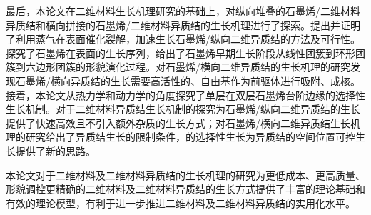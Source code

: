 \begin{chineseabstract}
    最后，本论文在二维材料生长机理研究的基础上，对纵向堆叠的石墨烯/二维材料异质结和横向拼接的石墨烯/二维材料异质结的生长机理进行了探索。提出并证明了利用蒸气在表面催化裂解，加速生长石墨烯/纵向二维异质结的方法及可行性。探究了石墨烯在表面的生长序列，给出了石墨烯早期生长阶段从线性团簇到环形团簇到六边形团簇的形貌演化过程。对石墨烯/横向二维异质结的生长机理的研究发现石墨烯/横向异质结的生长需要高活性的、自由基作为前驱体进行吸附、成核。接着，本论文从热力学和动力学的角度探究了单层在双层石墨烯台阶边缘的选择性生长机制。对于二维材料异质结生长机制的探究为石墨烯/纵向二维异质结的生长提供了快速高效且不引入额外杂质的生长方式；对石墨烯/横向二维异质结生长机理的研究给出了异质结生长的限制条件，的选择性生长为异质结的空间位置可控生长提供了新的思路。

    本论文对于二维材料及二维材料异质结的生长机理的研究为更低成本、更高质量、形貌调控更精确的二维材料及二维材料异质结的生长方式提供了丰富的理论基础和有效的理论模型，有利于进一步推进二维材料及二维材料异质结的实用化水平。

\end{chineseabstract}